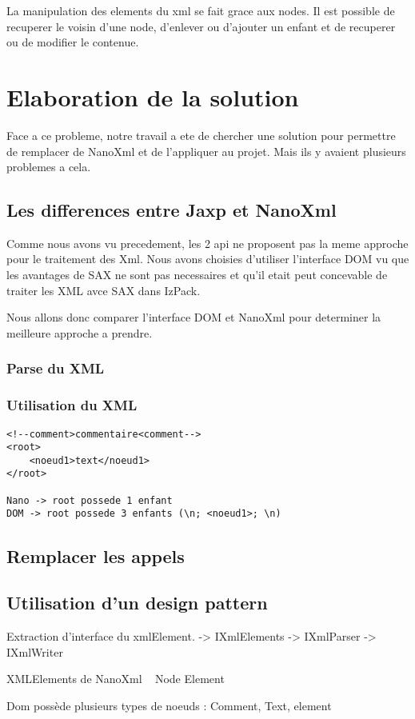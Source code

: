 La manipulation des elements du xml se fait grace aux nodes. Il est possible de recuperer le voisin d'une node, d'enlever ou d'ajouter un enfant et de recuperer ou de modifier le contenue.
\section{Elaboration de la solution}
Face a ce probleme, notre travail a ete de chercher une solution pour permettre de remplacer de NanoXml et de l'appliquer au projet. Mais ils y avaient plusieurs problemes a cela.
\subsection{Les differences entre Jaxp et NanoXml}
Comme nous avons vu precedement, les 2 api ne proposent pas la meme approche pour le traitement des Xml. Nous avons choisies d'utiliser l'interface DOM vu que les avantages de SAX ne sont pas necessaires et qu'il etait peut concevable de traiter les XML avce SAX dans IzPack.

Nous allons donc comparer l'interface DOM et NanoXml pour determiner la meilleure approche a prendre.
\subsubsection{Parse du XML}
\subsubsection{Utilisation du XML}

\begin{verbatim}
<!--comment>commentaire<comment-->
<root>
	<noeud1>text</noeud1>
</root>

Nano -> root possede 1 enfant
DOM -> root possede 3 enfants (\n; <noeud1>; \n)
\end{verbatim}
\subsection{Remplacer les appels}
\subsection{Utilisation d'un design pattern}
Extraction d'interface du xmlElement.
-> IXmlElements
-> IXmlParser
-> IXmlWriter

XMLElements de NanoXml ~ Node Element

Dom possède plusieurs types de noeuds : Comment, Text, element


